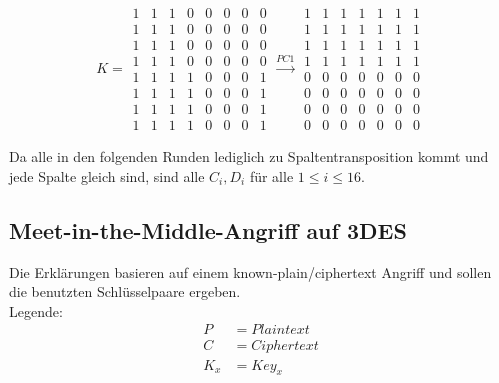 \begin{equation}
K=\begin{matrix}
1 & 1 & 1 & 0 & 0 & 0 & 0 & 0 \\
1 & 1 & 1 & 0 & 0 & 0 & 0 & 0 \\
1 & 1 & 1 & 0 & 0 & 0 & 0 & 0 \\
1 & 1 & 1 & 0 & 0 & 0 & 0 & 0 \\
1 & 1 & 1 & 1 & 0 & 0 & 0 & 1 \\
1 & 1 & 1 & 1 & 0 & 0 & 0 & 1 \\
1 & 1 & 1 & 1 & 0 & 0 & 0 & 1 \\
1 & 1 & 1 & 1 & 0 & 0 & 0 & 1 
\end{matrix} \xrightarrow{PC1}
\begin{matrix}
1 & 1 & 1 & 1 & 1 & 1 & 1 \\
1 & 1 & 1 & 1 & 1 & 1 & 1 \\
1 & 1 & 1 & 1 & 1 & 1 & 1 \\ 
1 & 1 & 1 & 1 & 1 & 1 & 1 \\ 
0 & 0 & 0 & 0 & 0 & 0 & 0 \\ 
0 & 0 & 0 & 0 & 0 & 0 & 0 \\ 
0 & 0 & 0 & 0 & 0 & 0 & 0 \\ 
0 & 0 & 0 & 0 & 0 & 0 & 0 
\end{matrix}
\end{equation}

Da alle in den folgenden Runden lediglich zu Spaltentransposition kommt und jede Spalte gleich sind, 
sind alle $C_i,D_i$ für alle $1 \le i \le 16$.

\subsection{Meet-in-the-Middle-Angriff auf 3DES}
 Die Erklärungen basieren auf einem known-plain/ciphertext Angriff und sollen die benutzten Schlüsselpaare ergeben.\\
 Legende:\\
 \begin{align*}
         P &= Plaintext\\
         C &= Ciphertext\\
         K_x &= Key_x
     \end{align*}
